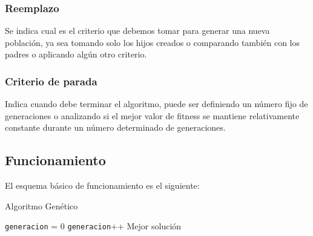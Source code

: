 \subsubsection{Reemplazo} 
Se indica cual es el criterio que debemos tomar para generar una nueva población, ya sea tomando solo los hijos creados o comparando también con los padres o aplicando algún otro criterio.

\subsubsection{Criterio de parada} 
Indica cuando debe terminar el algoritmo, puede ser definiendo un número fijo de generaciones o analizando si el mejor valor de fitness se mantiene relativamente constante durante un número determinado de generaciones.

\subsection{Funcionamiento}

El esquema básico de funcionamiento es el siguiente:


\begin{algorithm}%
	\caption{Algoritmo Genético}
	\label{alg:algoritmo_genetico_simple}
	\begin{algorithmic} [1] 
		{
			\STATE \texttt{generacion} = 0
			\STATE \texttt{generacion}++
			\ENDWHILE
			\RETURN Mejor solución
		}
	\end{algorithmic}
\end{algorithm}



%
%



